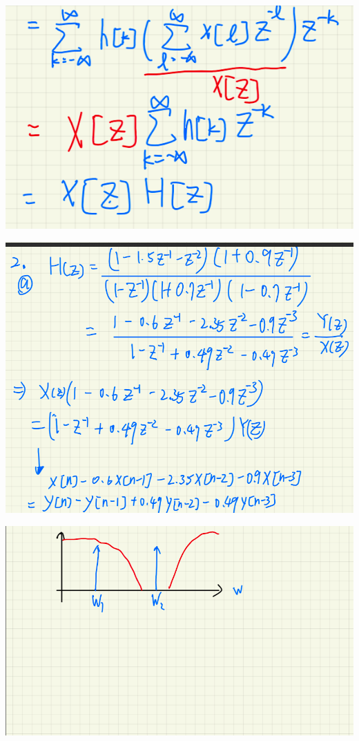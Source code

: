 \documentclass[a4paper]{article}
\begin{document}
	
	\begin{center}
		\includegraphics[width=1\linewidth]{screenshot108}
	\end{center}
	
	\begin{center}
		\includegraphics[width=1\linewidth]{screenshot109}
	\end{center}
	
	\begin{center}
		\includegraphics[width=1\linewidth]{screenshot112}
	\end{center}
	
\end{document}
